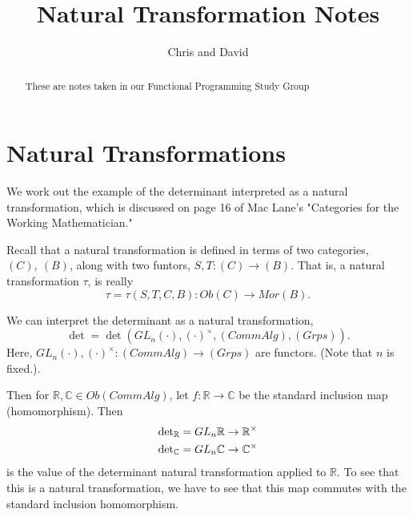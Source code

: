 \documentclass[]{article}
\title{Natural Transformation Notes}
\author{Chris and David}
\theoremstyle{definition}
\theoremstyle{remark}
\numberwithin{equation}{section}
\begin{document}
\maketitle

\begin{abstract}
	These are notes taken in our Functional Programming Study Group
\end{abstract}

\section{Natural Transformations}
	We work out the example of the determinant interpreted as a natural transformation, which is discussed on page 16 of Mac Lane's "Categories for the Working Mathematician."
	
	Recall that a natural transformation is defined in terms of two categories, $(C),\ (B)$, along with two funtors, $S,T: (C)\to (B)$. That is, a natural transformation $\tau$, is really
	\[
		\tau=\tau(S,T,C,B): Ob(C)\to Mor(B).
	\]
	
	We can interpret the determinant as a natural transformation, $$\det = \det (GL_n(\cdot), (\cdot)^\times,(CommAlg),(Grps)).$$
	Here, $GL_n(\cdot),(\cdot)^\times:(CommAlg)\to (Grps)$ are functors. (Note that $n$ is fixed.).
	
	Then for $\mathbb{R}, \mathbb{C}\in Ob(CommAlg)$, let $f:\mathbb{R}\to \mathbb{C}$ be the standard inclusion map (homomorphism). Then
	\begin{align*}
		{\rm det}_\mathbb{R} &= GL_n \mathbb{R}\to \mathbb{R}^\times\\
		{\rm det}_\mathbb{C} &= GL_n \mathbb{C}\to \mathbb{C}^\times
	\end{align*}
	is the value of the determinant natural transformation applied to $\mathbb{R}.$ To see that this is a natural transformation, we have to see that this map commutes with the standard inclusion homomorphism.
	
	
\end{document}
